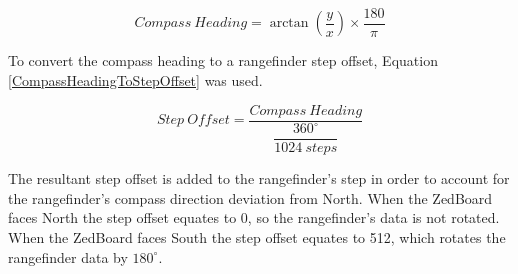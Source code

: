 \begin{equation}
	Compass\ Heading = \arctan(\dfrac{y}{x})\times\dfrac{180}{\pi}
	\label{GaussToDegrees}
\end{equation}

To convert the compass heading to a rangefinder step offset, Equation \ref{CompassHeadingToStepOffset} was used.

\begin{equation}
	Step\ Offset = \dfrac{Compass\ Heading}{\dfrac{360^\circ}{1024\ steps}}
	\label{CompassHeadingToStepOffset}
\end{equation}

The resultant step offset is added to the rangefinder's step in order to account for the rangefinder's compass direction deviation from North. When the ZedBoard faces North the step offset equates to 0, so the rangefinder's data is not rotated. When the ZedBoard faces South the step offset equates to 512, which rotates the rangefinder data by $180^\circ$.